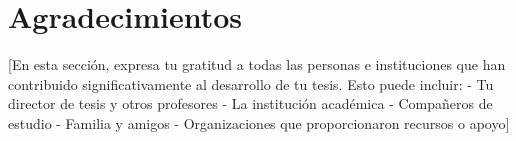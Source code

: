 \chapter*{Agradecimientos}

[En esta sección, expresa tu gratitud a todas las personas e instituciones que han contribuido significativamente al desarrollo de tu tesis. Esto puede incluir:
- Tu director de tesis y otros profesores
- La institución académica
- Compañeros de estudio
- Familia y amigos
- Organizaciones que proporcionaron recursos o apoyo]

\vspace{1cm}

\begin{flushright}
    [Tu nombre]
\end{flushright}